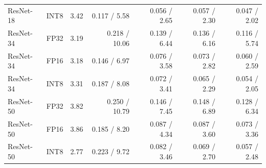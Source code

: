 {\begin{tabular}{@{}llrrrrr@{}}
ResNet-18 & INT8 & 3.42 & 0.117 / 5.58 & 0.056 / 2.65 & 0.057 / 2.30 & 0.047 / 2.02\\
ResNet-34 & FP32 & 3.19 & 0.218 / 10.06 & 0.139 / 6.44 & 0.136 / 6.16 & 0.116 / 5.74\\
ResNet-34 & FP16 & 3.18 & 0.146 / 6.97 & 0.076 / 3.58 & 0.073 / 2.82 & 0.060 / 2.59\\
ResNet-34 & INT8 & 3.31 & 0.187 / 8.08 & 0.072 / 3.41 & 0.065 / 2.29 & 0.054 / 2.05\\
ResNet-50 & FP32 & 3.82 & 0.250 / 10.79 & 0.146 / 7.45 & 0.148 / 6.89 & 0.128 / 6.34\\
ResNet-50 & FP16 & 3.86 & 0.185 / 8.20 & 0.087 / 4.34 & 0.087 / 3.60 & 0.073 / 3.36\\
ResNet-50 & INT8 & 2.77 & 0.223 / 9.72 & 0.082 / 3.46 & 0.069 / 2.70 & 0.057 / 2.48\\
\bottomrule
\end{tabular}}
\newcommand{\RandomProgress}{75}
\newcommand{\CutoffUTC}{2026-10-19 20:08 UTC}
